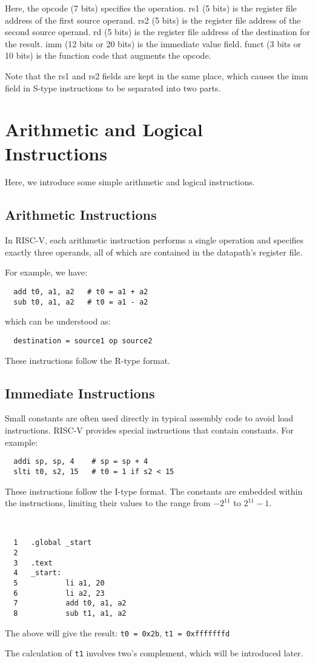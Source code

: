 Here, the opcode (7 bits) specifies the operation. rs1 (5 bits) is the register file address of the first source operand. rs2 (5 bits) is the register file address of the second source operand. rd (5 bits) is the register file address of the destination for the result. imm (12 bits or 20 bits) is the immediate value field. funct (3 bits or 10 bits) is the function code that augments the opcode.

Note that the rs1 and rs2 fields are kept in the same place, which causes the imm field in S-type instructions to be separated into two parts.

\section{Arithmetic and Logical Instructions}
Here, we introduce some simple arithmetic and logical instructions.

\subsection{Arithmetic Instructions}
In RISC-V, each arithmetic instruction performs a single operation and specifies exactly three operands, all of which are contained in the datapath's register file.

For example, we have:
\begin{verbatim}
  add t0, a1, a2   # t0 = a1 + a2
  sub t0, a1, a2   # t0 = a1 - a2
\end{verbatim}
which can be understood as:
\begin{verbatim}
  destination = source1 op source2
\end{verbatim}
These instructions follow the R-type format.

\subsection{Immediate Instructions}
Small constants are often used directly in typical assembly code to avoid load instructions. RISC-V provides special instructions that contain constants. For example:
\begin{verbatim}
  addi sp, sp, 4    # sp = sp + 4
  slti t0, s2, 15   # t0 = 1 if s2 < 15
\end{verbatim}
These instructions follow the I-type format. The constants are embedded within the instructions, limiting their values to the range from \(-2^{11}\) to \(2^{11} - 1\). 

\begin{eg}~

\begin{verbatim}
  1   .global _start
  2
  3   .text
  4   _start:
  5           li a1, 20
  6           li a2, 23
  7           add t0, a1, a2
  8           sub t1, a1, a2
\end{verbatim}
The above will give the result: \verb|t0 = 0x2b|, \verb|t1 = 0xfffffffd|

\begin{note}
  The calculation of \verb|t1| involves two's complement, which will be introduced later.
\end{note}
\end{eg}

